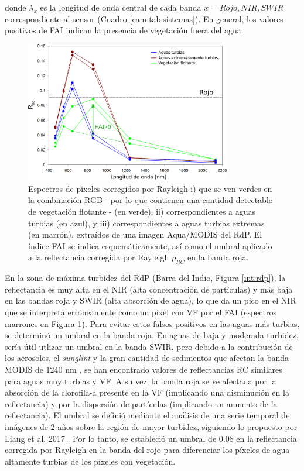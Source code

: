         \noindent
        donde $\lambda_{x}$ es la longitud de onda central de cada banda $x=Rojo, NIR, SWIR$ correspondiente al sensor (Cuadro \ref{cam:tab:sistemas}). En general, los valores positivos de FAI indican la presencia de vegetación fuera del agua.

        \begin{figure}
        \centering
        \includegraphics[width=0.8\textwidth]{cam/figures/firmasFAI.png}
        \caption[Espectros de píxeles corregidos por Rayleigh con vegetación flotante, correspondientes a aguas turbias y a aguas turbias extremas.]{Espectros de píxeles corregidos por Rayleigh i) que se ven verdes en la combinación RGB - por lo que contienen una cantidad detectable de vegetación flotante - (en verde), ii) correspondientes a aguas turbias (en azul), y iii) correspondientes a aguas turbias extremas (en marrón), extraídos de una imagen Aqua/MODIS del RdP. El índice FAI se indica esquemáticamente, así como el umbral aplicado a la reflectancia corregida por Rayleigh $\rho_{RC}$ en la banda roja.}
        \label{cam:firmasFAI}
        \end{figure}

        En la zona de máxima turbidez del RdP (Barra del Indio, Figura \ref{int:rdp}), la reflectancia es muy alta en el NIR (alta concentración de partículas) y más baja en las bandas roja y SWIR (alta absorción de agua), lo que da un pico en el NIR que se interpreta erróneamente como un píxel con VF por el FAI (espectros marrones en Figura \ref{cam:firmasFAI}). Para evitar estos falsos positivos en las aguas más turbias, se determinó un umbral en la banda roja. En aguas de baja y moderada turbidez,  sería útil utlizar un umbral en la banda SWIR, pero debido a la contribución de los aerosoles, el \textit{sunglint} y la gran cantidad de sedimentos que afectan la banda MODIS de 1240 nm \cite{shi2009}, se han encontrado valores de reflectancias RC similares para aguas muy turbias y VF.
        A su vez, la banda roja se ve afectada por la absorción de la clorofila-a presente en la VF (implicando una disminución en la reflectancia) y por la dispersión de partículas (implicando un aumento de la reflectancia). El umbral se definió mediante el análisis de una serie temporal de imágenes de 2 años sobre la región de mayor turbidez, siguiendo lo propuesto por Liang et al. 2017 \cite{liang2017}. Por lo tanto, se estableció un umbral de 0.08 en la reflectancia corregida por Rayleigh en la banda del rojo para diferenciar los píxeles de agua altamente turbias de los píxeles con vegetación.
        

